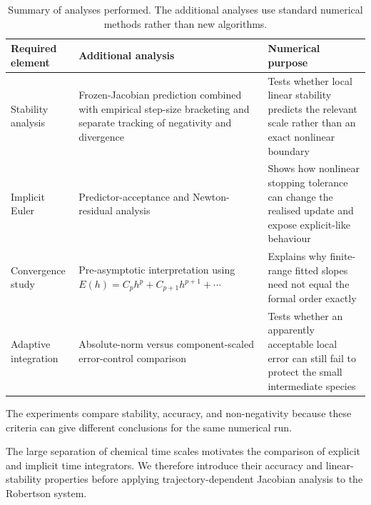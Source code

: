 \begin{table}[H]
\centering
\footnotesize
\caption{Summary of analyses performed. The additional analyses use standard numerical methods rather than new algorithms.}
\label{tab:extensions}
\begin{tabular}{@{}>{\raggedright\arraybackslash}p{}>{\raggedright\arraybackslash}p{}>{\raggedright\arraybackslash}p{}@{}}
\toprule
Required element&Additional analysis&Numerical purpose\\
\midrule
Stability analysis&Frozen-Jacobian prediction combined with empirical step-size bracketing and separate tracking of negativity and divergence&Tests whether local linear stability predicts the relevant scale rather than an exact nonlinear boundary\\
Implicit Euler&Predictor-acceptance and Newton-residual analysis&Shows how nonlinear stopping tolerance can change the realised update and expose explicit-like behaviour\\
Convergence study&Pre-asymptotic interpretation using $E(h)=C_ph^p+C_{p+1}h^{p+1}+\cdots$&Explains why finite-range fitted slopes need not equal the formal order exactly\\
Adaptive integration&Absolute-norm versus component-scaled error-control comparison&Tests whether an apparently acceptable local error can still fail to protect the small intermediate species\\
\bottomrule
\end{tabular}
\end{table}

The experiments compare stability, accuracy, and non-negativity because these criteria can give different conclusions for the same numerical run.

The large separation of chemical time scales motivates the comparison of explicit and implicit time integrators. We therefore introduce their accuracy and linear-stability properties before applying trajectory-dependent Jacobian analysis to the Robertson system.
